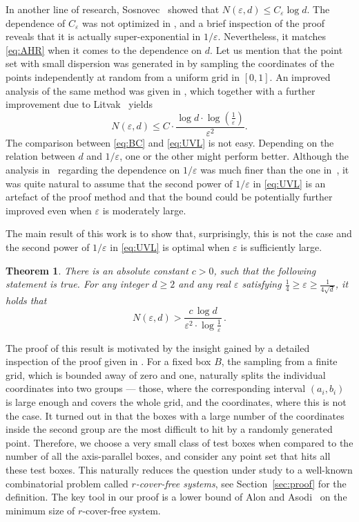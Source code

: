 \documentclass[11pt]{article}
\newtheorem{theorem}{Theorem}
\newcommand{\eps}{\varepsilon}
\begin{document}
In another line of research, Sosnovec~\cite{Sosnovec} showed that $N(\varepsilon,d)\le C_\varepsilon \log d.$
The dependence of $C_\varepsilon$ was not optimized in \cite{Sosnovec}, and a brief inspection of the proof reveals that it is actually super-exponential in $1/\varepsilon$.
Nevertheless, it matches \eqref{eq:AHR} when it comes to the dependence on $d$.
Let us mention that the point set with small dispersion was generated in \cite{Sosnovec}
by sampling the coordinates of the points independently at random from a uniform grid in $[0,1].$
An improved analysis of the same method was given in \cite{UV}, which together with a further improvement due to Litvak~\cite{Lit} yields
\begin{equation}\label{eq:UVL}
N(\varepsilon,d)\le C\cdot \frac{\log d \cdot \log(\frac 1\varepsilon)}{\varepsilon^2}.
\end{equation}
The comparison between \eqref{eq:BC} and \eqref{eq:UVL} is not easy. Depending on the relation between $d$ and $1/\varepsilon$, one or the other might perform better.
Although the analysis in~\cite{Lit,UV} regarding the dependence on $1/\varepsilon$ was much finer than the one in~\cite{Sosnovec},
it was quite natural to assume that the second power of $1/\varepsilon$ in \eqref{eq:UVL} is an artefact of the proof method and that the bound could be potentially further improved even when $\varepsilon$ is moderately large.

The main result of this work is to show that, surprisingly, this is not the case and the second power of $1/\varepsilon$ in \eqref{eq:UVL} is optimal when $\varepsilon$ is sufficiently large.
\begin{theorem}\label{thm:main}
There is an absolute constant $c>0$, such that the following statement is true. For any integer $d\ge 2$ and any real $\eps$ satisfying $\frac14 \ge \eps \ge \frac1{4\sqrt{d}}$,
it holds that
\begin{equation}\label{eq:mainthm}
N(\eps,d) >  \frac{ c\,\log d }{ \eps^2 \cdot \log{\frac1\eps} } 
\,.
\end{equation}
\end{theorem}

The proof of this result is motivated by the insight gained by a detailed inspection of the proof given in \cite{UV}.
For a fixed box $B$, the sampling from a finite grid, which is bounded away of zero and one, naturally splits the individual coordinates into two groups ---
those, where the corresponding interval $(a_i,b_i)$ is large enough and covers the whole grid, and the coordinates, where this is not the case.
It turned out in \cite{UV} that the boxes with a large number of the coordinates inside the second group are the most difficult to hit by a randomly generated point.
%
Therefore, we choose a very small class of test boxes when compared to the number of all the axis-parallel boxes, and consider any point set that hits all these test boxes.
This naturally reduces the question under study to a well-known combinatorial problem called \emph{$r$-cover-free systems}, see Section~\ref{sec:proof} for the definition.
The key tool in our proof is a lower bound of Alon and Asodi~\cite{AA} on the minimum size of {$r$-cover-free system}.
\end{document}
